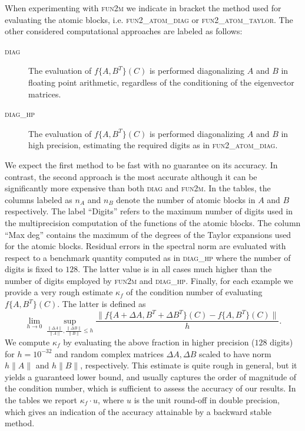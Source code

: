 \documentclass{siamart1116}
\newcommand{\norm}[1]{\lVert#1\rVert}
\begin{document}
When experimenting with  \textsc{fun2m} we indicate in bracket the method used for evaluating the atomic blocks, i.e. \textsc{fun2\_atom\_diag} or \textsc{fun2\_atom\_taylor}. 
The other considered computational approaches are labeled as follows:
\begin{description}
\item[\normalfont\textsc{diag}] The evaluation of $f\{A,B^T\}(C)$ is performed diagonalizing $A$ and $B$ in floating point arithmetic, regardless of the conditioning of the eigenvector matrices.
\item[\normalfont\textsc{diag\_hp}] The evaluation of $f\{A,B^T\}(C)$ is performed diagonalizing $A$ and $B$ in high precision, estimating the required digits as in \textsc{fun2\_atom\_diag}.
\end{description}
We expect the first method to be fast with no guarantee on its accuracy. In contrast, the second approach is the most accurate although it can be significantly more expensive than both \textsc{diag} and \textsc{fun2m}. In the tables, the columns labeled as $n_A$ and $n_B$ denote the number of atomic blocks in $A$ and $B$ respectively. The label ``Digits'' refers to the maximum number of digits used in the multiprecision computation of the functions of the atomic blocks. The column 
``Max deg'' contains the maximum of the degrees of the Taylor expansions used for the atomic blocks. Residual errors in the spectral norm are evaluated with respect to a benchmark quantity computed as in \textsc{diag\_hp} where the number of digits is fixed to $128$. The latter value is in all cases much higher than the number of digits employed by \textsc{fun2m} and \textsc{diag\_hp}.
Finally, for each example we provide a very rough estimate $\kappa_f$ of the condition number of 
evaluating $f\{A,B^T\}(C)$. The latter is defined as
$$
\lim_{h\to 0} \sup_{\frac{\norm{\Delta A}}{\norm {A}},\frac{\norm{\Delta B}}{\norm{B}}\leq h}\frac{\norm{f\{A+\Delta A,B^T+\Delta B^T\}(C)-f\{A,B^T\}(C)}}{h}.
$$
We compute $\kappa_f$ by evaluating the above fraction in higher precision ($128$ digits) for $h=10^{-32}$ and
random complex matrices $\Delta A,\Delta B$ scaled to have norm $h\norm{A}$ and $h\norm{B}$, respectively. 
This estimate is quite rough in general, but it yields a guaranteed lower bound, and usually captures the order 
of magnitude of the condition number, which is sufficient to assess the accuracy of our results. 
In the tables we report $\kappa_f \cdot u$, where $u$ is the unit round-off in double precision, which gives an indication of the accuracy attainable by a backward stable method.
\end{document}
